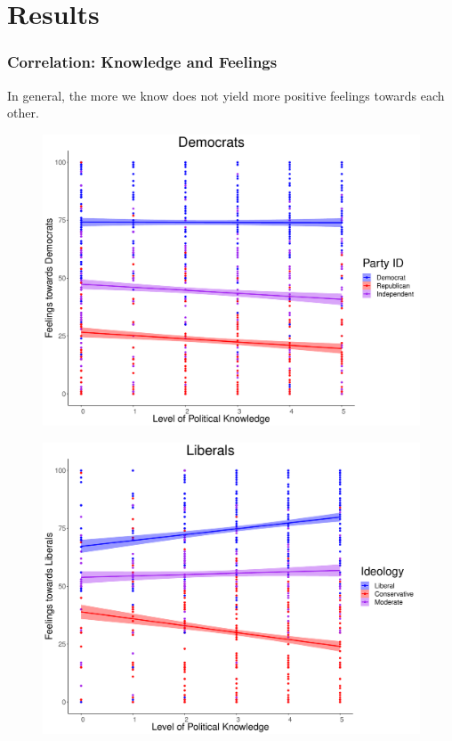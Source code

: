 \documentclass[14pt]{beamer}
\begin{document}
\section{Results}

\begin{frame}
\frametitle{Correlation: Knowledge and Feelings}
\begin{center}
In general, the more we know does not yield more positive feelings towards each other.
\end{center}
\end{frame}

\begin{frame}
\begin{center}
	\begin{figure}[ht!]  
		{	 \includegraphics[width=\textwidth]{KFDem}}
	\end{figure}
\end{center}
\end{frame}

\begin{frame}
\begin{center}
	\begin{figure}[ht!]  
		{	 \includegraphics[width=\textwidth]{KFLib}}
	\end{figure}
\end{center}
\end{frame}
\end{document}
